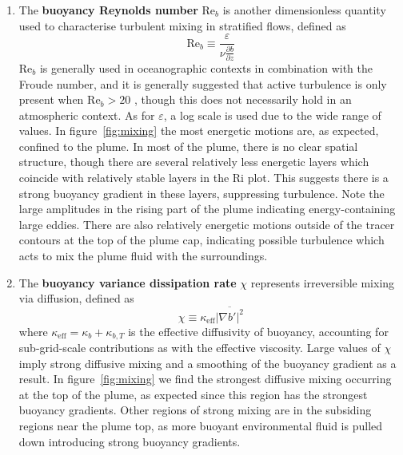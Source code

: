 \documentclass[a4paper]{article}
\begin{document}
\begin{enumerate}[label=(\alph*)]
	\item The \textbf{buoyancy Reynolds number} $\mathrm{Re}_b$ is another dimensionless quantity used to
		characterise turbulent mixing in stratified flows, defined as
		\begin{equation}
			\mathrm{Re}_b \equiv \frac{\varepsilon}{\nu \frac{\partial b}{\partial z}}
		\end{equation}
		$\mathrm{Re}_b$ is generally used in oceanographic contexts in combination with the Froude number, and
		it is generally suggested that active turbulence is only present when $\mathrm{Re}_b > 20$
		\citep{garcia2011}, though this does not necessarily hold in an atmospheric context. As for
		$\varepsilon$, a log scale is used due to the wide range of values. In figure~\ref{fig:mixing} the
		most energetic motions are, as expected, confined to the plume. In most of the plume, there is no
		clear spatial structure, though there are several relatively less energetic layers which coincide with
		relatively stable layers in the $\mathrm{Ri}$ plot. This suggests there is a strong buoyancy gradient
		in these layers, suppressing turbulence. Note the large amplitudes in the rising part of the plume
		indicating energy-containing large eddies. There are also relatively energetic motions
		outside of the tracer contours at the top of the plume cap, indicating possible turbulence which acts
		to mix the plume fluid with the surroundings.

	\item The \textbf{buoyancy variance dissipation rate} $\chi$ represents irreversible mixing via diffusion,
		defined as
		\begin{equation}
			\chi \equiv \kappa_{\text{eff}} \overline{\left| \nabla b' \right|^2}
		\end{equation}
		where $\kappa_{\text{eff}} = \kappa_b + \kappa_{b,T}$ is the effective diffusivity of buoyancy,
		accounting for sub-grid-scale contributions as with the effective viscosity. Large values of $\chi$
		imply strong diffusive mixing and a smoothing of the buoyancy gradient as a result. In
		figure~\ref{fig:mixing} we find the strongest diffusive mixing occurring at the top of the plume, as
		expected since this region has the strongest buoyancy gradients. Other regions of strong mixing are in
		the subsiding regions near the plume top, as more buoyant environmental fluid is pulled down
		introducing strong buoyancy gradients.


\end{enumerate}
\end{document}
